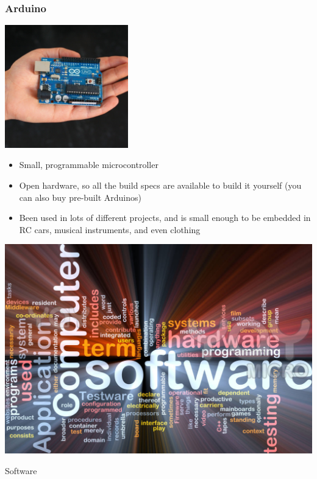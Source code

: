 \documentclass{beamer}
\begin{document}

\begin{frame}
  \frametitle{Arduino}
  \begin{center} \includegraphics[width=0.4\textwidth]{../img/arduino} \end{center}
  \begin{itemize}
  \item Small, programmable \textcolor{beamer@myblue}{microcontroller}
  \item Open hardware, so all the build specs are available to build
    it yourself (you can also buy pre-built Arduinos)
  \item Been used in lots of different projects, and is small enough to be embedded in RC cars, musical instruments, and even clothing
  \end{itemize}
\end{frame}


\begin{frame}
  \begin{center} 
    \includegraphics[width=1\textwidth]{../img/software-words-3}
    \begin{Huge} Software \end{Huge} 
  \end{center}
\end{frame}
\end{document}
